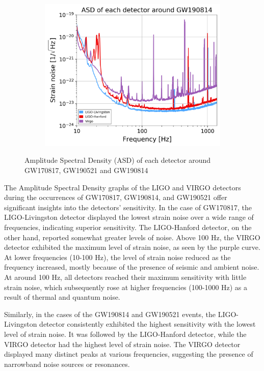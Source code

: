 \begin{figure}[htb]
\begin{subfigure}{0.45\textwidth}
    \end{subfigure}
    \hfill
    \begin{subfigure}{0.45\textwidth}
        \centering
        \includegraphics[width=1.0\linewidth]{GWanalysisProject_codefile/asd_plot/GW190814asd.png}
        \label{fig: gw190521asd}
    \end{subfigure}
    \caption{Amplitude Spectral Density (ASD) of each detector around GW170817, GW190521 and GW190814}
    \label{fig: asdplot}
\end{figure}

The Amplitude Spectral Density graphs of the LIGO and VIRGO detectors during the occurrences of GW170817, GW190814, and GW190521 offer significant insights into the detectors' sensitivity. In the case of GW170817, the LIGO-Livingston detector displayed the lowest strain noise over a wide range of frequencies, indicating superior sensitivity. The LIGO-Hanford detector, on the other hand, reported somewhat greater levels of noise. Above 100 Hz, the VIRGO detector exhibited the maximum level of strain noise, as seen by the purple curve. At lower frequencies (10-100 Hz), the level of strain noise reduced as the frequency increased, mostly because of the presence of seismic and ambient noise. At around 100 Hz, all detectors reached their maximum sensitivity with little strain noise, which subsequently rose at higher frequencies (100-1000 Hz) as a result of thermal and quantum noise.

Similarly, in the cases of the GW190814 and GW190521 events, the LIGO-Livingston detector consistently exhibited the highest sensitivity with the lowest level of strain noise. It was followed by the LIGO-Hanford detector, while the VIRGO detector had the highest level of strain noise. The VIRGO detector displayed many distinct peaks at various frequencies, suggesting the presence of narrowband noise sources or resonances. 


